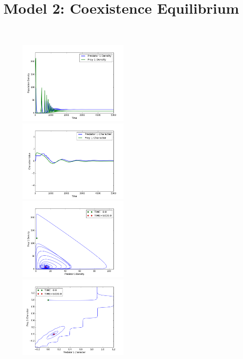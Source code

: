 \documentclass{amsart}
\theoremstyle{definition}
\theoremstyle{remark}
\numberwithin{equation}{section}
\begin{document}
\begin{centering}
\begin{figure}
		\label{fig:variable_growth_exclusion}
	\end{figure}
	\begin{figure}
		\title{\bf Model 2: Coexistence Equilibrium\\}
		\includegraphics[width=6cm,height=4.1cm]{figures/1x1/variable_growth/stable_coexistence/densities.png}
		\includegraphics[width=6cm,height=4.1cm]{figures/1x1/variable_growth/stable_coexistence/traits.png}
		\includegraphics[width=6cm,height=4.1cm]{figures/1x1/variable_growth/stable_coexistence/density_phase_plane.png}
		\includegraphics[width=6cm,height=4.1cm]{figures/1x1/variable_growth/stable_coexistence/trait_phase_plane.png}

\end{figure}
\end{centering}
\end{document}
